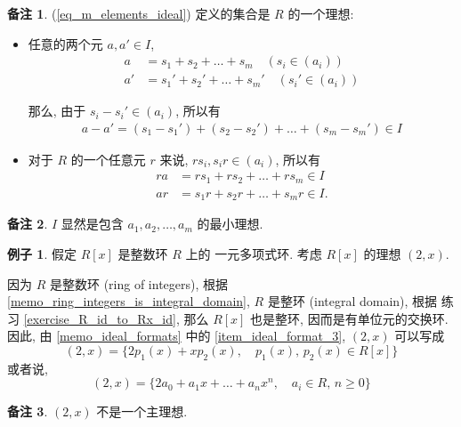 \documentclass[utf8]{ctexbook}
\theoremstyle{definition}
\newtheorem{memo}{备注}[section]
\newtheorem{example}{例子}[section]
\begin{document}
\begin{memo}
(\ref{eq_m_elements_ideal}) 定义的集合是 $R$ 的一个理想:
\begin{itemize}
\item{任意的两个元 $a, a' \in I$,
\begin{align*}
a &= s_1 + s_2 + \ldots + s_m \quad (s_i \in (a_i)) \\
a' &= s_1 ' + s_2 ' + \ldots + s_m ' \quad (s_i ' \in (a_i) )
\end{align*}

那么, 由于 $s_i - s_i ' \in (a_i)$, 所以有
\begin{align*}
a-a' = (s_1 - s_1 ') + (s_2 - s_2 ') + \ldots + (s_m - s_m ') \in I
\end{align*}
}
\item{
对于 $R$ 的一个任意元 $r$ 来说, $rs_i, s_i r \in (a_i)$, 所以有
\begin{align*}
ra &= r s_1 + r s_2 + \ldots + r s_m \in I \\
ar &= s_1 r + s_2 r + \ldots + s_m r \in I .
\end{align*}
}
\end{itemize}
\end{memo}

\begin{memo}
$I$ 显然是包含 $a_1, a_2, \ldots, a_m$ 的最小理想.
\end{memo}

\begin{example}\label{example_R_polynomial_not_principle_ideal}
假定 $R[x]$ 是整数环 $R$ 上的 一元多项式环. 考虑 $R[x]$ 的理想 $(2, x)$.

因为 $R$ 是整数环 (ring of integers), 根据 \ref{memo_ring_integers_is_integral_domain}, $R$ 是整环 (integral domain), 根据 练习 \ref{exercise_R_id_to_Rx_id}, 那么  $R[x]$ 也是整环, 因而是有单位元的交换环. 因此, 由 \ref{memo_ideal_formats} 中的 \ref{item_ideal_format_3}, $(2, x)$ 可以写成
\begin{equation}
(2, x) = \{ 2 p_1 (x) + x p_2 (x) , \quad p_1 (x), \, p_2 (x) \in R[x] \}
\end{equation}
或者说,
\begin{equation}
(2, x) = \{ 2 a_0 + a_1 x + \ldots + a_n x^n  , \quad a_i \in R, \, n \geq 0 \}
\end{equation}

\end{example}


\begin{memo}\label{memo_2_x_not_max_ideal}
$(2, x)$ 不是一个主理想. 
\end{memo}
\end{document}
